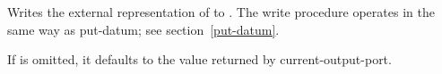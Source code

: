 \begin{entry}{%
}

Writes the external representation of  to .
The {\cf write}
procedure operates in the same way as {\cf put-datum}; see
section~\ref{put-datum}.

If  is omitted, it defaults to the value returned by
{\cf current-output-port}.
\end{entry}



